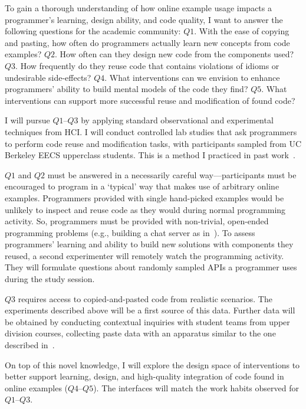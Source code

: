 \documentclass[12pt]{memoir}
\begin{document}
To gain a thorough understanding of how online example usage impacts a programmer's learning, design ability, and code quality, I want to answer the following questions for the academic community:
$Q1$. With the ease of copying and pasting, how often do programmers actually learn new concepts from code examples?
$Q2$. How often can they design new code from the components used?
$Q3$. How frequently do they reuse code that contains violations of idioms or undesirable side-effects?
$Q4$. What interventions can we envision to enhance programmers' ability to build mental models of the code they find?
$Q5$. What interventions can support more successful reuse and modification of found code?


I will pursue $Q1$--$Q3$ by applying standard observational and experimental techniques from HCI\@.
I will conduct controlled lab studies that ask programmers to perform code reuse and modification tasks, with participants sampled from UC Berkeley EECS upperclass students.
This is a method I practiced in past work~\cite{head_tutorons_2015}.

$Q1$ and $Q2$ must be answered in a necessarily careful way---participants must be encouraged to program in a `typical' way that makes use of arbitrary online examples.
Programmers provided with single hand-picked examples would be unlikely to inspect and reuse code as they would during normal programming activity.
So, programmers must be provided with non-trivial, open-ended programming problems (e.g., building a chat server as in~\cite{brandt_two_2009}).
To assess programmers' learning and ability to build new solutions with components they reused,
a second experimenter will remotely watch the programming activity.
They will formulate questions about randomly sampled APIs a programmer uses during the study session.

$Q3$ requires access to copied-and-pasted code from realistic scenarios.
The experiments described above will be a first source of this data.
Further data will be obtained by conducting contextual inquiries with student teams from upper division courses, collecting paste data with an apparatus similar to the one described in~\cite{kim_ethnographic_2004}.

On top of this novel knowledge, I will explore the design space of interventions to better support learning, design, and high-quality integration of code found in online examples ($Q4$--$Q5$).
The interfaces will match the work habits observed for $Q1$--$Q3$.
\end{document}
